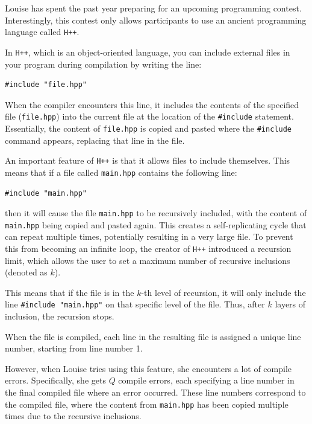 
\noindent
Louise has spent the past year preparing for an upcoming programming contest. 
Interestingly, this contest only allows participants to use an ancient programming language called \verb|H++|.

In \verb|H++|, which is an object-oriented language, you can include external files in your program during compilation
by writing the line:

\begin{verbatim}
#include "file.hpp"
\end{verbatim}

When the compiler encounters this line, it includes the contents of the specified file (\texttt{file.hpp}) into the
current file at the location of the \verb|#include| statement. Essentially, the content of \texttt{file.hpp} is copied
and pasted where the \verb|#include| command appears, replacing that line in the file.

An important feature of \verb|H++| is that it allows files to include themselves. This means that if a file called
\texttt{main.hpp} contains the following line:

\begin{verbatim}
#include "main.hpp"
\end{verbatim}

then it will cause the file \texttt{main.hpp} to be recursively included, with the content of \texttt{main.hpp}
being copied and pasted again. This creates a self-replicating cycle that can repeat multiple times, potentially
resulting in a very large file. To prevent this from becoming an infinite loop, the creator of \verb|H++| introduced
a recursion limit, which allows the user to set a maximum number of recursive inclusions (denoted as $k$).

This means that if the file is in the $k$-th level of recursion, 
it will only include the line \verb|#include "main.hpp"| on that specific level of the file. 
Thus, after $k$ layers of inclusion, the recursion stops.

When the file is compiled, each line in the resulting file is assigned a unique line number, starting
from line number 1.

However, when Louise tries using this feature, she encounters a lot of compile errors. 
Specifically, she gets $Q$ compile errors, each specifying a line number in the final compiled file where
an error occurred. These line numbers correspond to the compiled file, where the content from \texttt{main.hpp}
has been copied multiple times due to the recursive inclusions.

